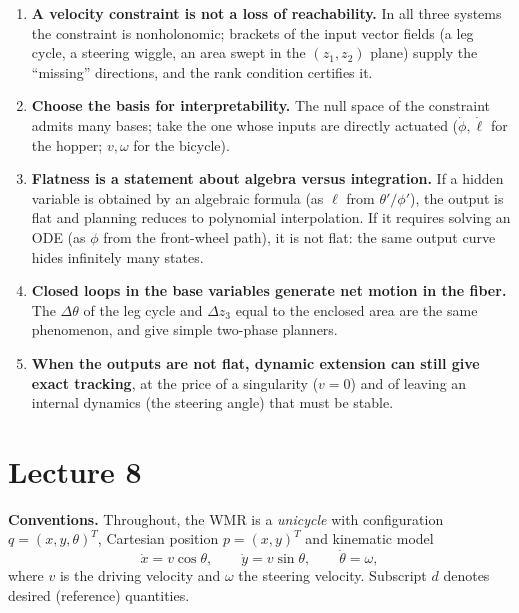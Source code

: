 \documentclass[11pt,a4paper]{article}
\def\bm#1{#1}%
\def\vect#1{#1}%
\newcommand{\vect}[1]{\bm{#1}}
\theoremstyle{definition}
\theoremstyle{plain}
\theoremstyle{remark}
\begin{document}
\begin{enumerate}
  \item \textbf{A velocity constraint is not a loss of reachability.} In all three systems the constraint is nonholonomic; brackets of the input vector fields (a leg cycle, a steering wiggle, an area swept in the $(z_1,z_2)$ plane) supply the ``missing'' directions, and the rank condition certifies it.
  \item \textbf{Choose the basis for interpretability.} The null space of the constraint admits many bases; take the one whose inputs are directly actuated ($\dot\phi,\dot\ell$ for the hopper; $v,\omega$ for the bicycle).
  \item \textbf{Flatness is a statement about algebra versus integration.} If a hidden variable is obtained by an algebraic formula (as $\ell$ from $\theta'/\phi'$), the output is flat and planning reduces to polynomial interpolation. If it requires solving an ODE (as $\phi$ from the front-wheel path), it is not flat: the same output curve hides infinitely many states.
  \item \textbf{Closed loops in the base variables generate net motion in the fiber.} The $\Delta\theta$ of the leg cycle and $\Delta z_3$ equal to the enclosed area are the same phenomenon, and give simple two-phase planners.
  \item \textbf{When the outputs are not flat, dynamic extension can still give exact tracking}, at the price of a singularity ($v=0$) and of leaving an internal dynamics (the steering angle) that must be stable.
\end{enumerate}

\newpage

\setcounter{section}{0}
\renewcommand{\thesection}{\arabic{section}}
\part{Lecture 8}

\noindent\textbf{Conventions.} Throughout, the WMR is a \emph{unicycle} with configuration $\vect q=(x,y,\theta)^T$, Cartesian position $\vect p=(x,y)^T$ and kinematic model
\begin{equation}\label{eq:unicycle}
\dot x=v\cos\theta,\qquad \dot y=v\sin\theta,\qquad \dot\theta=\omega,
\end{equation}
where $v$ is the driving velocity and $\omega$ the steering velocity. Subscript $d$ denotes desired (reference) quantities.
\end{document}
